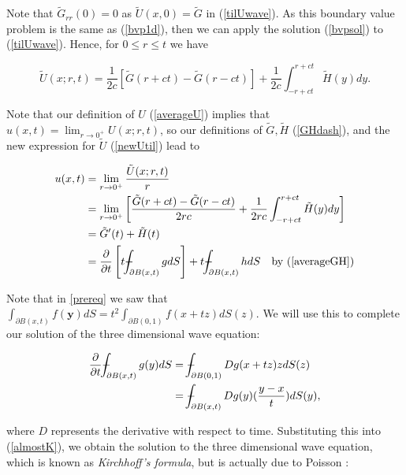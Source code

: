 \documentclass[12pt]{article}
\def\Xint#1{\mathchoice
{\XXint\displaystyle\textstyle{#1}}%
{\XXint\textstyle\scriptstyle{#1}}%
{\XXint\scriptstyle\scriptscriptstyle{#1}}%
{\XXint\scriptscriptstyle\scriptscriptstyle{#1}}%
\!\int}
\def\XXint#1#2#3{{\setbox0=\hbox{$#1{#2#3}{\int}$ }
\vcenter{\hbox{$#2#3$ }}\kern-.6\wd0}}
\def\dashint{\Xint-}
\numberwithin{equation}{section}
\begin{document}
Note that $\tilde{G}_{rr}(0)=0$ as $\tilde{U}(x,0)=\tilde{G}$ in (\ref{tilUwave}). As this boundary value problem is the same as (\ref{bvp1d}), then we can apply 
the solution (\ref{bvpsol}) to (\ref{tilUwave}). Hence, for $0 \le r \le t$ we have 

\begin{equation} \label{newUtil}
    \tilde{U}(x;r,t)=\frac{1}{2c}\left[\tilde{G}(r+ct)-\tilde{G}(r-ct)\right]+\frac{1}{2c}\int^{r+ct}_{-r+ct}\tilde{H}(y)dy.
\end{equation}

Note that our definition of $U$ (\ref{averageU}) implies that $u(x,t)=\lim_{r\rightarrow 0^+}U(x;r,t)$, so our definitions of $\tilde{G}, \tilde{H}$ (\ref{GHdash}),
 and the new expression for $\tilde{U}$ (\ref{newUtil}) lead to

\begin{equation} \label{almostK}
    \begin{aligned}
        u(x,t)&=\lim_{r\rightarrow 0^+}\frac{\tilde{U}(x;r,t)}{r}\\
        &=\lim_{r\rightarrow 0^+}\left[\frac{\tilde{G}(r+ct)-\tilde{G}(r-ct)}{2rc}+\frac{1}{2rc}\int^{r+ct}_{-r+ct}\tilde{H}(y)dy\right]\\
        &=\tilde{G}'(t)+\tilde{H}(t)\\
        &=\diffp[1]{}{t}\left[t\dashint_{\partial B(x,t)}{gdS} \right]+t\dashint_{\partial B(x,t)}{hdS} \quad \textrm{by (\ref{averageGH})}
    \end{aligned}
\end{equation}

Note that in \ref{prereq} we saw that $\int_{\partial B(x,t)}f(\boldsymbol{y})dS=t^2\int_{\partial B(0,1)} f(x+tz)dS(z)$. We will use this to complete our solution of the
three dimensional wave equation:

\begin{equation*}
    \begin{aligned}
    \diffp[1]{}{t}\dashint_{\partial B(x,t)} {g(y)dS} &= \dashint_{\partial B(0,1)} {Dg(x+tz)zdS(z)}\\
    &=\dashint_{\partial B(x,t)}{Dg(y)(\frac{y-x}{t})dS(y)},
    \end{aligned}
\end{equation*}

where $D$ represents the derivative with respect to time. Substituting this into (\ref{almostK}), we obtain the solution to the three dimensional wave equation, which is known as \emph{Kirchhoff's formula}, but is 
actually due to Poisson \cite{Str}:
\end{document}
